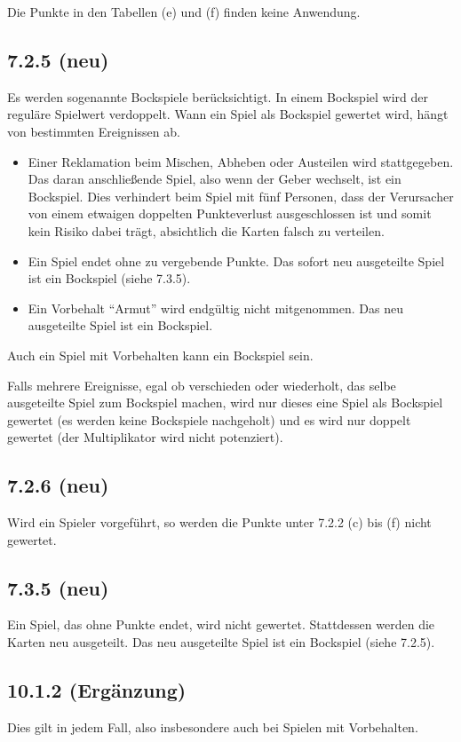 Die Punkte in den Tabellen (e) und (f) finden keine Anwendung.

\subsection*{7.2.5 (neu)}

Es werden sogenannte Bockspiele berücksichtigt. In einem Bockspiel wird 
der reguläre Spielwert verdoppelt. Wann ein Spiel als Bockspiel 
gewertet wird, hängt von bestimmten Ereignissen ab. 

\begin{itemize}
	\item Einer Reklamation beim Mischen, Abheben oder Austeilen wird
		stattgegeben. Das daran anschließende Spiel, also wenn der Geber
		wechselt, ist ein Bockspiel. Dies verhindert beim Spiel mit fünf
		Personen, dass der Verursacher von einem etwaigen doppelten
		Punkteverlust ausgeschlossen ist und somit kein Risiko dabei
		trägt, absichtlich die Karten falsch zu verteilen.
	\item Ein Spiel endet ohne zu vergebende Punkte. Das sofort neu
		ausgeteilte Spiel ist ein Bockspiel (siehe 7.3.5).
	\item Ein Vorbehalt ``Armut'' wird endgültig nicht mitgenommen. Das
		neu ausgeteilte Spiel ist ein Bockspiel.
\end{itemize}

Auch ein Spiel mit Vorbehalten kann ein Bockspiel sein.

Falls mehrere Ereignisse, egal ob verschieden oder wiederholt, das selbe 
ausgeteilte Spiel zum Bockspiel machen, wird nur dieses eine Spiel als 
Bockspiel gewertet (es werden keine Bockspiele nachgeholt) und es wird 
nur doppelt gewertet (der Multiplikator wird nicht potenziert). 

 \subsection*{7.2.6 (neu)} 

Wird ein Spieler vorgeführt, so werden die Punkte unter 7.2.2 (c) bis 
(f) nicht gewertet. 

\subsection*{7.3.5 (neu)} 

Ein Spiel, das ohne Punkte endet, wird nicht gewertet. Stattdessen 
werden die Karten neu ausgeteilt. Das neu ausgeteilte Spiel ist ein 
Bockspiel (siehe 7.2.5). 

\subsection*{10.1.2 (Ergänzung)} 

Dies gilt in jedem Fall, also insbesondere auch bei Spielen mit 
Vorbehalten. 
